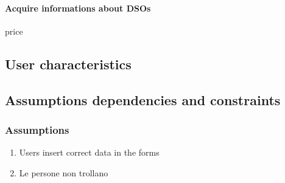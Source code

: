 \paragraph{Acquire informations about \acp{DSO}}
price



\subsection{User characteristics}

\subsection{Assumptions dependencies and constraints}
\subsubsection{Assumptions}
\begin{enumerate}[label=A\arabic*]
      \item Users insert correct data in the forms
      \item Le persone non trollano
\end{enumerate}
\clearpage